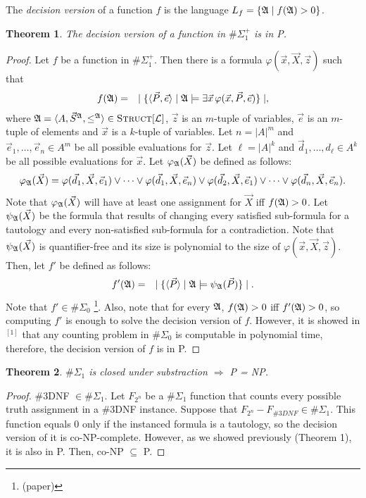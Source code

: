 \documentclass[12pt]{article}
\def\E1{\#\Sigma_1^{+}}
\def\Truc{\textsc{Struct}[\L]}
\def\A{{\frak A}}
\def\L{{\cal L}}
\def\P{\vec{P}}
\def\S{\vec{S}}
\def\X{\vec{X}}
\def\d{\vec{d}} %
\def\e{\vec{e}} %
\def\x{\vec{x}} %
\def\z{\vec{z}} %
\newtheorem{theo}{Theorem}
\begin{document}
The {\em decision version} of a function $f$ is the language $L_f = \{\A \mid f(\A) > 0\}$.
\begin{theo}
The decision version of a function in $\E1$ is in \textsc{P}.
\end{theo}
\begin{proof}
Let $f$ be a function in $\E1$. Then there is a formula $\varphi(\x,\X,\z)$ such that
\begin{eqnarray*}
f(\A) &=& \mid \{ \langle\P,\e\rangle \mid \A \models \exists \x \, \varphi(\x,\P,\e) \} \mid,
\end{eqnarray*}
where $\A = \langle A, \S^{\A}, \leq^{\A} \rangle \in \Truc$, $\z$ is an $m$-tuple of variables, $\e$ is an $m$-tuple of elements and $\x$ is a $k$-tuple of variables. Let $n = \vert A \vert^m$ and $\e_1,\dots,\e_n \in A^m$ be all possible evaluations for $\z$. Let $\ell = \vert A \vert^k$ and $\d_1,\dots,d_\ell\in A^k$ be all possible evaluations for $\x$. Let $\varphi_\A(\X)$ be defined as follows:
\begin{eqnarray*}
\varphi_\A(\X) = \varphi(\d_1,\X,\e_1) \vee \cdots \vee \varphi(\d_1,\X,\e_n) \vee \varphi(\d_2,\X,\e_1) \vee \cdots \vee \varphi(\d_n,\X,\e_n).
\end{eqnarray*}
Note that $\varphi_\A(\X)$ will have at least one assignment for $\X$ iff $f(\A)>0$. Let $\psi_\A(\X)$ be the formula that results of changing every satisfied sub-formula for a tautology and every non-satisfied sub-formula for a contradiction. Note that $\psi_\A(\X)$ is quantifier-free and its size is polynomial to the size of $\varphi(\x,\X,\z)$. Then, let $f'$ be defined as follows:
\begin{eqnarray*}
f'(\A) &=& \mid \{ \langle\P\rangle \mid \A \models \psi_\A(\P) \} \mid.
\end{eqnarray*}
Note that $f' \in\#\Sigma_0$ \footnote[1]{(paper)}. Also, note that for every $\A$, $f(\A) > 0$ iff $f'(\A) > 0$, so computing $f'$ is enough to solve the decision version of $f$. However, it is showed in $^{[1]}$ that any counting problem in $\#\Sigma_0$ is computable in polynomial time, therefore, the decision version of $f$ is in P.
\end{proof}

\begin{theo}
$\#\Sigma_1$ is closed under substraction $\Rightarrow$ P = NP.
\end{theo}
\begin{proof}
\#3DNF $\in \#\Sigma_1$. Let $F_{2^n}$ be a $\#\Sigma_1$ function that counts every possible truth assignment in a \#3DNF instance. Suppose that $F_{2^n}-F_{\#3DNF} \in \#\Sigma_1$. This function equals 0 only if the instanced formula is a tautology, so the decision version of it is co-NP-complete. However, as we showed previously (Theorem 1), it is also in P. Then, co-NP $\subseteq$ P.
\end{proof}
\end{document}
